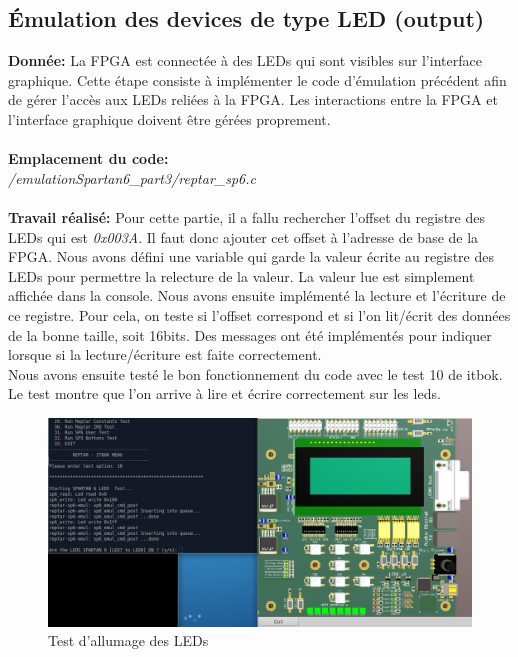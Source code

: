 \subsection{Émulation des devices de type LED (output)}
\textbf{Donnée: }La FPGA est connectée à des LEDs qui sont visibles sur l'interface graphique. Cette étape consiste à
implémenter le code d'émulation précédent afin de gérer l'accès aux LEDs reliées à la FPGA.
Les interactions entre la FPGA et l'interface graphique doivent être gérées proprement. \\\\
\textbf{Emplacement du code:}\\\textit{/emulationSpartan6\_part3/reptar\_sp6.c}\\\\
\textbf{Travail réalisé: }Pour cette partie, il a fallu rechercher l'offset du registre des LEDs qui est \textit{0x003A}. Il faut donc ajouter cet offset à l'adresse de base de la FPGA. Nous avons défini une variable qui garde la valeur écrite au registre des LEDs pour permettre la relecture de la valeur. La valeur lue est simplement affichée dans la console. Nous avons ensuite implémenté la lecture et l'écriture de ce registre. Pour cela, on teste si l'offset correspond et si l'on lit/écrit des données de la bonne taille, soit 16bits. Des messages ont été implémentés pour indiquer lorsque si la lecture/écriture est faite correctement.
\\Nous avons ensuite testé le bon fonctionnement du code avec le test 10 de itbok. Le test montre que l'on arrive à lire et écrire correctement sur les leds.
\begin{figure}[H]
	\begin{center}
		\includegraphics[width=17cm]{img/leds1.png}
		\caption{Test d'allumage des LEDs}
		\label{leds1}
	\end{center}
\end{figure}
